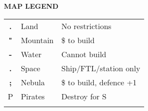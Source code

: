 \begin{flushleft}
\textbf{MAP LEGEND}
\end{flushleft}
\begin{tabular}{|c|ll}
\hhline{-}
\cellcolor{land}\textbf{.} & Land
                           & {\color{supplemental} No restrictions}       \\ \hhline{-}
\cellcolor{mountain}\textbf{"} & Mountain
                           & {\color{supplemental} \$ to build}           \\ \hhline{-}
\cellcolor{water}\textbf{-} & Water
                           & {\color{supplemental} Cannot build}          \\ \hhline{-}
\cellcolor{space}\textcolor{stars}{\textbf{.}}            & Space
                           & {\color{supplemental} Ship/FTL/station only} \\ \hhline{-}
\cellcolor{nebula}\textcolor{stars}{\textbf{;}} & Nebula
                           & {\color{supplemental} \$ to build, defence +1}       \\ \hhline{-}
P & Pirates
                           & {\color{supplemental} Destroy for S}         \\ \hhline{-}
\end{tabular}
